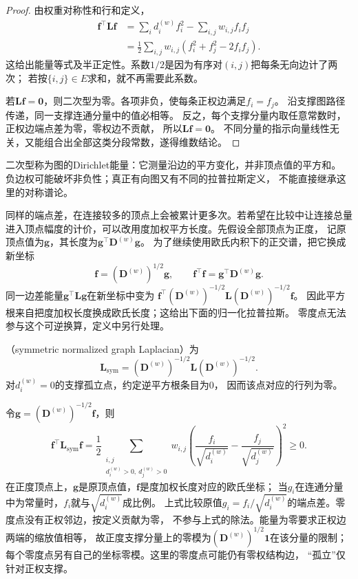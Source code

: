 \begin{proof}
由权重对称性和行和定义，
\begin{align*}
  \bm f^\top\bm L\bm f
  &=\sum_i d_i^{(w)}f_i^2-\sum_{i,j}w_{i,j}f_if_j\\
  &=\frac12\sum_{i,j}w_{i,j}(f_i^2+f_j^2-2f_if_j).
\end{align*}
这给出能量等式及半正定性。系数\(1/2\)是因为有序对\((i,j)\)把每条无向边计了两次；
若按\(\{i,j\}\in E\)求和，就不再需要此系数。

若\(\bm L\bm f=\bm0\)，则二次型为零。各项非负，使每条正权边满足\(f_i=f_j\)。
沿支撑图路径传递，同一支撑连通分量中的值必相等。
反之，每个支撑分量内取任意常数时，正权边端点差为零，零权边不贡献，
所以\(\bm L\bm f=\bm0\)。
不同分量的指示向量线性无关，又能组合出全部这类分段常数，遂得维数结论。
\end{proof}

二次型称为图的Dirichlet能量：它测量沿边的平方变化，并非顶点值的平方和。
负边权可能破坏非负性；真正有向图又有不同的拉普拉斯定义，
不能直接继承这里的对称谱论。

同样的端点差，在连接较多的顶点上会被累计更多次。若希望在比较中让连接总量
进入顶点幅度的计价，可以改用度加权平方长度。先假设全部顶点为正度，
记原顶点值为\(\bm g\)，其长度为\(\bm g^\top\bm D^{(w)}\bm g\)。
为了继续使用欧氏内积下的正交谱，把它换成新坐标
\begin{equation}
  \bm f=(\bm D^{(w)})^{1/2}\bm g,\qquad
  \bm f^\top\bm f=\bm g^\top\bm D^{(w)}\bm g.
  \label{eq:graph-theory-degree-coordinates}
\end{equation}
同一边差能量\(\bm g^\top\bm L\bm g\)在新坐标中变为
\(\bm f^\top(\bm D^{(w)})^{-1/2}\bm L(\bm D^{(w)})^{-1/2}\bm f\)。
因此平方根来自把度加权长度换成欧氏长度；这给出下面的归一化拉普拉斯。
零度点无法参与这个可逆换算，定义中另行处理。
\begin{definition}[对称归一化拉普拉斯]
  \label{def:graph-theory-normalized-laplacian}
  （symmetric normalized graph Laplacian）为
  \begin{equation}
    \bm L_{\mathrm{sym}}
    =(\bm D^{(w)})^{-1/2}\bm L(\bm D^{(w)})^{-1/2}.
    \label{eq:graph-theory-normalized-laplacian}
  \end{equation}
  对\(d_i^{(w)}=0\)的支撑孤立点，约定逆平方根条目为\(0\)，
  因而该点对应的行列为零。
\end{definition}

令\(\bm g=(\bm D^{(w)})^{-1/2}\bm f\)，则
\[
  \bm f^\top\bm L_{\mathrm{sym}}\bm f
  =\frac12\sum_{\substack{i,j\\d_i^{(w)}>0,\ d_j^{(w)}>0}}
    w_{i,j}\left(\frac{f_i}{\sqrt{d_i^{(w)}}}
      -\frac{f_j}{\sqrt{d_j^{(w)}}}\right)^2\geq0.
\]
在正度顶点上，\(\bm g\)是原顶点值，\(\bm f\)是度加权长度对应的欧氏坐标；
当\(g_i\)在连通分量中为常量时，\(f_i\)就与\(\sqrt{d_i^{(w)}}\)成比例。
上式比较原值\(g_i=f_i/\sqrt{d_i^{(w)}}\)的端点差。零度点没有正权邻边，按定义贡献为零，
不参与上式的除法。能量为零要求正权边两端的缩放值相等，
故正度支撑分量上的零模为\((\bm D^{(w)})^{1/2}\bm1\)在该分量的限制；
每个零度点另有自己的坐标零模。这里的零度点可能仍有零权结构边，
“孤立”仅针对正权支撑。

